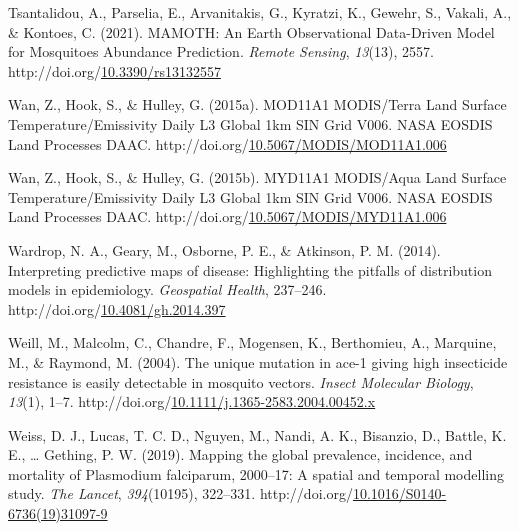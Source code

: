\documentclass[12pt,twoside]{reedthesis}
\newlength{\cslhangindent}
\newenvironment{CSLReferences}[2] %
 {%
  \setlength{\parindent}{0pt}
  \ifodd #1 \everypar{\setlength{\hangindent}{\cslhangindent}}\ignorespaces\fi
  \ifnum #2 > 0
  \setlength{\parskip}{#2\baselineskip}
  \fi
 }%
 {}
\begin{document}
\begin{CSLReferences}{1}{0}
\leavevmode{}%
Tsantalidou, A., Parselia, E., Arvanitakis, G., Kyratzi, K., Gewehr, S., Vakali, A., \& Kontoes, C. (2021). {MAMOTH}: {An} {Earth} {Observational} {Data}-{Driven} {Model} for {Mosquitoes} {Abundance} {Prediction}. \emph{Remote Sensing}, \emph{13}(13), 2557. http://doi.org/\href{https://doi.org/10.3390/rs13132557}{10.3390/rs13132557}

\leavevmode{}%
Wan, Z., Hook, S., \& Hulley, G. (2015a). {MOD11A1} {MODIS}/{Terra} {Land} {Surface} {Temperature}/{Emissivity} {Daily} {L3} {Global} 1km {SIN} {Grid} {V006}. NASA EOSDIS Land Processes DAAC. http://doi.org/\href{https://doi.org/10.5067/MODIS/MOD11A1.006}{10.5067/MODIS/MOD11A1.006}

\leavevmode{}%
Wan, Z., Hook, S., \& Hulley, G. (2015b). {MYD11A1} {MODIS}/{Aqua} {Land} {Surface} {Temperature}/{Emissivity} {Daily} {L3} {Global} 1km {SIN} {Grid} {V006}. NASA EOSDIS Land Processes DAAC. http://doi.org/\href{https://doi.org/10.5067/MODIS/MYD11A1.006}{10.5067/MODIS/MYD11A1.006}

\leavevmode{}%
Wardrop, N. A., Geary, M., Osborne, P. E., \& Atkinson, P. M. (2014). Interpreting predictive maps of disease: Highlighting the pitfalls of distribution models in epidemiology. \emph{Geospatial Health}, 237--246. http://doi.org/\href{https://doi.org/10.4081/gh.2014.397}{10.4081/gh.2014.397}

\leavevmode{}%
Weill, M., Malcolm, C., Chandre, F., Mogensen, K., Berthomieu, A., Marquine, M., \& Raymond, M. (2004). The unique mutation in ace-1 giving high insecticide resistance is easily detectable in mosquito vectors. \emph{Insect Molecular Biology}, \emph{13}(1), 1--7. http://doi.org/\href{https://doi.org/10.1111/j.1365-2583.2004.00452.x}{10.1111/j.1365-2583.2004.00452.x}

\leavevmode{}%
Weiss, D. J., Lucas, T. C. D., Nguyen, M., Nandi, A. K., Bisanzio, D., Battle, K. E., \ldots{} Gething, P. W. (2019). Mapping the global prevalence, incidence, and mortality of {Plasmodium} falciparum, 2000--17: A spatial and temporal modelling study. \emph{The Lancet}, \emph{394}(10195), 322--331. http://doi.org/\href{https://doi.org/10.1016/S0140-6736(19)31097-9}{10.1016/S0140-6736(19)31097-9}


\end{CSLReferences}
\end{document}
